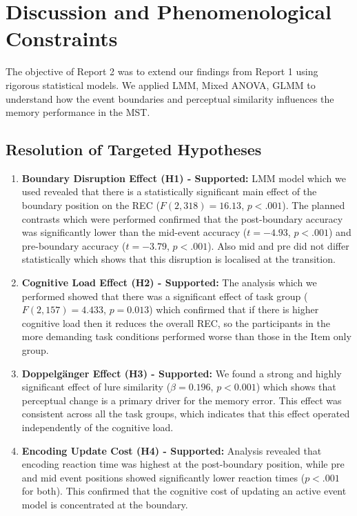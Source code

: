 \documentclass[
  12pt,
]{article}
\begin{document}
\section{Discussion and Phenomenological Constraints}
\label{discussion-and-phenomenological-constraints}

The objective of Report 2 was to extend our findings from Report 1 using rigorous statistical models. We applied LMM, Mixed ANOVA, GLMM to understand how the event boundaries and perceptual similarity influences the memory performance in the MST.

\subsection{Resolution of Targeted Hypotheses}

\begin{enumerate}
\item
\textbf{Boundary Disruption Effect (H1) - Supported:}
LMM model which we used revealed that there is a statistically significant main effect of the boundary position on the REC ($F(2, 318) = 16.13$, $p < .001$). The planned contrasts which were performed confirmed that the post-boundary accuracy was significantly lower than the mid-event accuracy ($t = -4.93$, $p < .001$) and pre-boundary accuracy ($t = -3.79$, $p < .001$). Also mid and pre did not differ statistically which shows that this disruption is localised at the transition.

\item
\textbf{Cognitive Load Effect (H2) - Supported:}
The analysis which we performed showed that there was a significant effect of task group ($F(2, 157) = 4.433$, $p = 0.013$) which confirmed that if there is higher cognitive load then it reduces the overall REC, so the participants in the more demanding task conditions performed worse than those in the Item only group.


\item
\textbf{Doppelgänger Effect (H3) - Supported:}
We found a strong and highly significant effect of lure similarity ($\beta = 0.196$, $p < 0.001$) which shows that perceptual change is a primary driver for the memory error. This effect was consistent across all the task groups, which indicates that this effect operated independently of the cognitive load.

\item
\textbf{Encoding Update Cost (H4) - Supported:}
Analysis revealed that encoding reaction time was highest at the post-boundary position,   while pre and mid event positions showed significantly lower reaction times ($p < .001$ for both). This confirmed that the cognitive cost of updating an active event model is concentrated at the boundary.
\end{enumerate}
\end{document}
